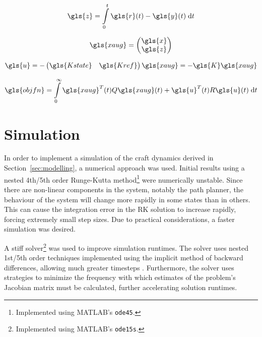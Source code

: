 \documentclass{sydeStyle}
\begin{document}
\begin{equation}
    \gls{z} = \int\limits_0^t \gls{r}(t) - \gls{y}(t) \; \textrm{d}t
    \label{eqn:z}
\end{equation}

\begin{equation}
    \gls{xaug} =
    \begin{pmatrix}
        \gls{x} \\ \gls{z}
    \end{pmatrix}
    \label{eqn:xaug}
\end{equation}

\begin{equation}
    \gls{u}
    =
    -
    \begin{pmatrix}
        \gls{Kstate} & \gls{Kref}
    \end{pmatrix}
    \gls{xaug}
    = - \gls{K} \gls{xaug}
    \label{eqn:ctrllaw}
\end{equation}

\begin{equation}
    \gls{objfn} = \int\limits_0^\infty \gls{xaug}^T(t)Q\gls{xaug}(t) +
    \gls{u}^T(t)R\gls{u}(t) \; \textrm{d}t
    \label{eqn:cost}
\end{equation}

\section{Simulation}
\label{sec:simulation}
In order to implement a simulation of the craft dynamics derived in
Section~\ref{sec:modelling}, a numerical approach was used.  Initial results
using a nested 4th/5th order Runge-Kutta method\footnote{Implemented using
MATLAB's \texttt{ode45}.} were numerically unstable.  Since there are non-linear
components in the system, notably the path planner, the behaviour of the system
will change more rapidly in some states than in others.  This can cause the
integration error in the RK solution to increase rapidly, forcing extremely
small step sizes.  Due to practical considerations, a faster simulation was
desired.

A stiff solver\footnote{Implemented using MATLAB's \texttt{ode15s}.} was used to
improve simulation runtimes.  The solver uses nested 1st/5th order techniques
implemented using the implicit method of backward differences, allowing much
greater timesteps \cite{SR97}.  Furthermore, the solver uses strategies to
minimize the frequency with which estimates of the problem's Jacobian matrix
must be calculated, further accelerating solution runtimes.
\end{document}
